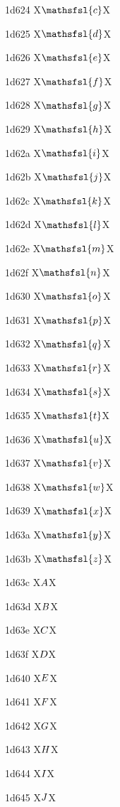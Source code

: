\documentclass[11pt]{article}
\begin{document}
1d624 X{\ensuremath{\mathsfsl{c}}}X

1d625 X{\ensuremath{\mathsfsl{d}}}X

1d626 X{\ensuremath{\mathsfsl{e}}}X

1d627 X{\ensuremath{\mathsfsl{f}}}X

1d628 X{\ensuremath{\mathsfsl{g}}}X

1d629 X{\ensuremath{\mathsfsl{h}}}X

1d62a X{\ensuremath{\mathsfsl{i}}}X

1d62b X{\ensuremath{\mathsfsl{j}}}X

1d62c X{\ensuremath{\mathsfsl{k}}}X

1d62d X{\ensuremath{\mathsfsl{l}}}X

1d62e X{\ensuremath{\mathsfsl{m}}}X

1d62f X{\ensuremath{\mathsfsl{n}}}X

1d630 X{\ensuremath{\mathsfsl{o}}}X

1d631 X{\ensuremath{\mathsfsl{p}}}X

1d632 X{\ensuremath{\mathsfsl{q}}}X

1d633 X{\ensuremath{\mathsfsl{r}}}X

1d634 X{\ensuremath{\mathsfsl{s}}}X

1d635 X{\ensuremath{\mathsfsl{t}}}X

1d636 X{\ensuremath{\mathsfsl{u}}}X

1d637 X{\ensuremath{\mathsfsl{v}}}X

1d638 X{\ensuremath{\mathsfsl{w}}}X

1d639 X{\ensuremath{\mathsfsl{x}}}X

1d63a X{\ensuremath{\mathsfsl{y}}}X

1d63b X{\ensuremath{\mathsfsl{z}}}X

1d63c X{\ensuremath{\mathsfbfsl{A}}}X

1d63d X{\ensuremath{\mathsfbfsl{B}}}X

1d63e X{\ensuremath{\mathsfbfsl{C}}}X

1d63f X{\ensuremath{\mathsfbfsl{D}}}X

1d640 X{\ensuremath{\mathsfbfsl{E}}}X

1d641 X{\ensuremath{\mathsfbfsl{F}}}X

1d642 X{\ensuremath{\mathsfbfsl{G}}}X

1d643 X{\ensuremath{\mathsfbfsl{H}}}X

1d644 X{\ensuremath{\mathsfbfsl{I}}}X

1d645 X{\ensuremath{\mathsfbfsl{J}}}X
\end{document}
